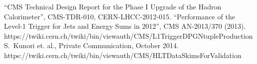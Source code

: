 \documentclass[11pt]{cmspaperpdf}
\begin{document}
\newpage

\begin{thebibliography}{99}

 ``CMS Technical Design Report for the Phase I Upgrade of the Hadron Calorimeter'', CMS-TDR-010, CERN-LHCC-2012-015.
 ``Performance of the Level-1 Trigger for Jets and Energy Sums in 2012'', CMS AN-2013/370 (2013).
 https://twiki.cern.ch/twiki/bin/viewauth/CMS/L1TriggerDPGNtupleProduction
 S.~Kunori et. al., Private Communication, October 2014.
 https://twiki.cern.ch/twiki/bin/viewauth/CMS/HLTDataSkimsForValidation

\end{thebibliography}

\clearpage
\appendix
\end{document}
